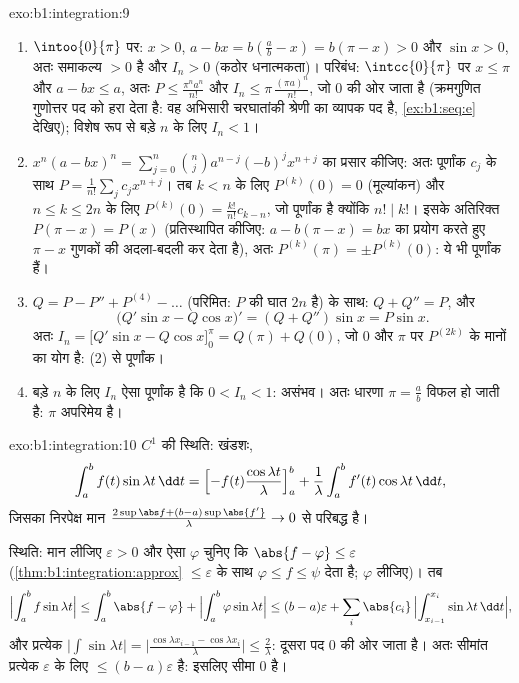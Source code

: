 \begin{solution}{exo:b1:integration:9}
\begin{enumerate}
  \item $\intoo{0}{\pi}$ पर: $x > 0$, $a - bx = b(\frac ab - x) = b(\pi - x)
  > 0$ और $\sin x > 0$, अतः समाकल्य $> 0$ है और $I_n > 0$ (कठोर धनात्मकता)।
  परिबंध: $\intcc{0}{\pi}$ पर $x \leq \pi$ और $a - bx \leq a$, अतः $P \leq
  \frac{\pi^n a^n}{n!}$ और $I_n \leq \pi\,\frac{(\pi a)^n}{n!}$, जो $0$ की
  ओर जाता है (क्रमगुणित गुणोत्तर पद को हरा देता है: वह अभिसारी चरघातांकी
  श्रेणी का व्यापक पद है, \cref{ex:b1:seq:e} देखिए); विशेष रूप से बड़े $n$
  के लिए $I_n < 1$।
  \item $x^n(a - bx)^n = \sum_{j=0}^{n} \binom nj a^{n-j} (-b)^j x^{n+j}$ का
  प्रसार कीजिए: अतः पूर्णांक $c_j$ के साथ $P = \frac{1}{n!}\sum_j c_j
  x^{n+j}$। तब $k < n$ के लिए $P^{(k)}(0) = 0$ (मूल्यांकन) और $n \leq k \leq
  2n$ के लिए $P^{(k)}(0) = \frac{k!}{n!} c_{k-n}$, जो पूर्णांक है क्योंकि
  $n! \mid k!$। इसके अतिरिक्त $P(\pi - x) = P(x)$ (प्रतिस्थापित कीजिए: $a -
  b(\pi - x) = bx$ का प्रयोग करते हुए $\pi - x$ गुणकों की अदला-बदली कर देता
  है), अतः $P^{(k)}(\pi) = \pm P^{(k)}(0)$: ये भी पूर्णांक हैं।
  \item $Q = P - P'' + P^{(4)} - \dots$ (परिमित: $P$ की घात $2n$ है) के साथ:
  $Q + Q'' = P$, और
        \[
        \bigl(Q'\sin x - Q\cos x\bigr)' = (Q + Q'')\sin x = P\sin x .
        \]
        अतः $I_n = \bigl[Q'\sin x - Q\cos x\bigr]_0^{\pi} = Q(\pi) + Q(0)$,
        जो $0$ और $\pi$ पर $P^{(2k)}$ के मानों का योग है: (2) से पूर्णांक।
  \item बड़े $n$ के लिए $I_n$ ऐसा पूर्णांक है कि $0 < I_n < 1$: असंभव। अतः
  धारणा $\pi = \frac ab$ विफल हो जाती है: $\pi$ अपरिमेय है।
\end{enumerate}
\end{solution}

\begin{solution}{exo:b1:integration:10}
$C^1$ की स्थिति: खंडशः,
\[
\int_a^b f(t)\sin\lambda t\,\dd t
= \Bigl[-f(t)\frac{\cos\lambda t}{\lambda}\Bigr]_a^b
+ \frac{1}{\lambda}\int_a^b f'(t)\cos\lambda t\,\dd t,
\]
जिसका निरपेक्ष मान $\frac{2\sup\abs f + (b - a)\sup\abs{f'}} {\lambda} \to
0$ से परिबद्ध है।

 स्थिति: मान लीजिए $\varepsilon > 0$ और ऐसा  $\varphi$ चुनिए कि
$\abs{f - \varphi} \leq \varepsilon$ (\cref{thm:b1:integration:approx}
$\leq\varepsilon$  के साथ $\varphi \leq f \leq \psi$ देता है;
$\varphi$ लीजिए)। तब
\[
\Bigl|\int_a^b f\sin\lambda t\Bigr|
\leq \int_a^b \abs{f - \varphi}
+ \Bigl|\int_a^b \varphi \sin\lambda t\Bigr|
\leq (b-a)\varepsilon
+ \sum_i \abs{c_i}\,\Bigl|\int_{x_{i-1}}^{x_i} \sin\lambda t\,\dd
t\Bigr| ,
\]
और प्रत्येक $\bigl|\int \sin \lambda t\bigr| = \bigl|\frac{\cos\lambda
x_{i-1} - \cos\lambda x_i}{\lambda}\bigr| \leq \frac{2}{\lambda}$: दूसरा पद
$0$ की ओर जाता है। अतः  सीमांत प्रत्येक $\varepsilon$ के लिए $\leq
(b-a)\varepsilon$ है: इसलिए सीमा $0$ है।
\end{solution}

